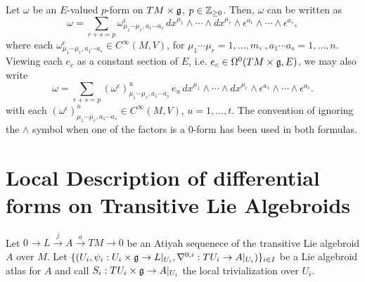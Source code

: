 \begin{proposition}\label{TheoremDecompOfVectorValuedFormsTLAEpsilonsDxs}
Let $\omega$ be an $E$-valued $p$-form on $TM \times \mathfrak{g}$, $p \in \mathbb{Z}_{\geq 0}$. Then, $\omega$ can be written as
\begin{equation}
    \omega = \sum_{r + s = p} \omega^\epsilon_{\mu_1 \cdots \mu_r, a_1 \cdots a_s}\, dx^{\mu_1} \wedge \cdots \wedge dx^{\mu_r} \wedge \epsilon^{a_1} \wedge \cdots \wedge \epsilon^{a_s},
\end{equation}
where each $\omega^\epsilon_{\mu_1 \cdots \mu_r, a_1 \cdots a_s} \in C^\infty(M, V)$, for $\mu_1 \cdots \mu_r = 1, \dots, m$, $, a_1 \cdots a_s = 1, \dots, n$. Viewing each $e_c$ as a constant section of $E$, i.e. $e_c \in \Omega^0(TM \times \mathfrak{g}, E)$, we may also write
\begin{equation}
    \omega = \sum_{r + s = p} \left(\omega^\epsilon\right)^u_{\mu_1 \cdots \mu_r, a_1 \cdots a_s}\, e_u \, dx^{\mu_1} \wedge \cdots \wedge dx^{\mu_r} \wedge \epsilon^{a_1} \wedge \cdots \wedge \epsilon^{a_s}.
\end{equation} 
with each $\left(\omega^\epsilon\right)^u_{\mu_1 \cdots \mu_r, a_1 \cdots a_s} \in C^\infty(M, V)$, $u = 1, \dots, t$.
The convention of ignoring the $\wedge$ symbol when one of the factors is a $0$-form has been used in both formulas.
\end{proposition}

\section{Local Description of differential forms on Transitive Lie Algebroids}

Let $0 \to L \xrightarrow{j} A \xrightarrow{a} TM \to 0$ be an Atiyah sequenece of the transitive Lie algebroid $A$ over $M$. Let $\{(U_i, \psi_i: U_i \times \mathfrak{g} \to L|_{U_i}, \nabla^{0, i}: TU_i \to A|_{U_i})\}_{i \in I}$ be a Lie algebroid atlas for $A$ and call $S_i: TU_i \times \mathfrak{g} \to A|_{U_i}$ the local trivialization over $U_i$.

